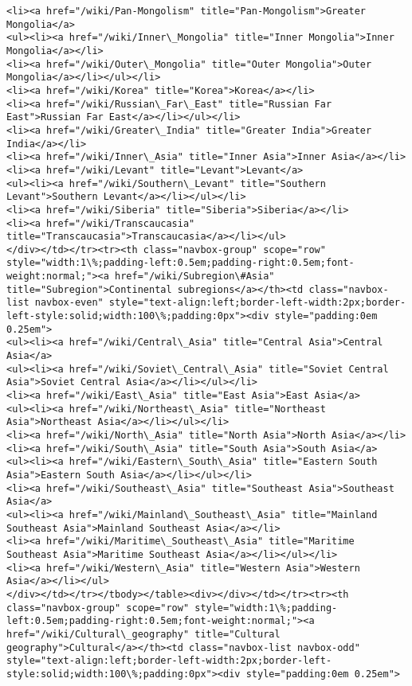 \documentclass[11pt]{article}
\begin{document}
\begin{Verbatim}[commandchars=\\\{\}]
<li><a href="/wiki/Pan-Mongolism" title="Pan-Mongolism">Greater Mongolia</a>
<ul><li><a href="/wiki/Inner\_Mongolia" title="Inner Mongolia">Inner Mongolia</a></li>
<li><a href="/wiki/Outer\_Mongolia" title="Outer Mongolia">Outer Mongolia</a></li></ul></li>
<li><a href="/wiki/Korea" title="Korea">Korea</a></li>
<li><a href="/wiki/Russian\_Far\_East" title="Russian Far East">Russian Far East</a></li></ul></li>
<li><a href="/wiki/Greater\_India" title="Greater India">Greater India</a></li>
<li><a href="/wiki/Inner\_Asia" title="Inner Asia">Inner Asia</a></li>
<li><a href="/wiki/Levant" title="Levant">Levant</a>
<ul><li><a href="/wiki/Southern\_Levant" title="Southern Levant">Southern Levant</a></li></ul></li>
<li><a href="/wiki/Siberia" title="Siberia">Siberia</a></li>
<li><a href="/wiki/Transcaucasia" title="Transcaucasia">Transcaucasia</a></li></ul>
</div></td></tr><tr><th class="navbox-group" scope="row" style="width:1\%;padding-left:0.5em;padding-right:0.5em;font-weight:normal;"><a href="/wiki/Subregion\#Asia" title="Subregion">Continental subregions</a></th><td class="navbox-list navbox-even" style="text-align:left;border-left-width:2px;border-left-style:solid;width:100\%;padding:0px"><div style="padding:0em 0.25em">
<ul><li><a href="/wiki/Central\_Asia" title="Central Asia">Central Asia</a>
<ul><li><a href="/wiki/Soviet\_Central\_Asia" title="Soviet Central Asia">Soviet Central Asia</a></li></ul></li>
<li><a href="/wiki/East\_Asia" title="East Asia">East Asia</a>
<ul><li><a href="/wiki/Northeast\_Asia" title="Northeast Asia">Northeast Asia</a></li></ul></li>
<li><a href="/wiki/North\_Asia" title="North Asia">North Asia</a></li>
<li><a href="/wiki/South\_Asia" title="South Asia">South Asia</a>
<ul><li><a href="/wiki/Eastern\_South\_Asia" title="Eastern South Asia">Eastern South Asia</a></li></ul></li>
<li><a href="/wiki/Southeast\_Asia" title="Southeast Asia">Southeast Asia</a>
<ul><li><a href="/wiki/Mainland\_Southeast\_Asia" title="Mainland Southeast Asia">Mainland Southeast Asia</a></li>
<li><a href="/wiki/Maritime\_Southeast\_Asia" title="Maritime Southeast Asia">Maritime Southeast Asia</a></li></ul></li>
<li><a href="/wiki/Western\_Asia" title="Western Asia">Western Asia</a></li></ul>
</div></td></tr></tbody></table><div></div></td></tr><tr><th class="navbox-group" scope="row" style="width:1\%;padding-left:0.5em;padding-right:0.5em;font-weight:normal;"><a href="/wiki/Cultural\_geography" title="Cultural geography">Cultural</a></th><td class="navbox-list navbox-odd" style="text-align:left;border-left-width:2px;border-left-style:solid;width:100\%;padding:0px"><div style="padding:0em 0.25em">

\end{Verbatim}
\end{document}
